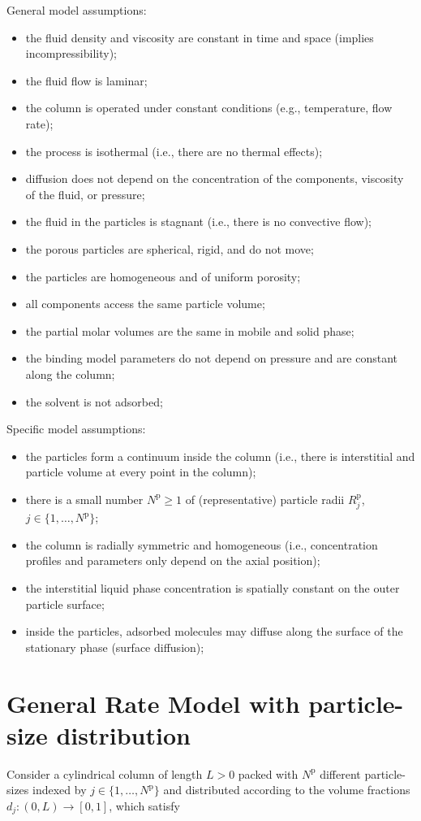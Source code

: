 \documentclass{article}
\begin{document}
General model assumptions:
\begin{itemize}
\item the fluid density and viscosity are constant in time and space (implies incompressibility);
\item the fluid flow is laminar;
\item the column is operated under constant conditions (e.g., temperature, flow rate);
\item the process is isothermal (i.e., there are no thermal effects);
\item diffusion does not depend on the concentration of the components, viscosity of the fluid, or pressure;
\item the fluid in the particles is stagnant (i.e., there is no convective flow);
\item the porous particles are spherical, rigid, and do not move;
\item the particles are homogeneous and of uniform porosity;
\item all components access the same particle volume;
\item the partial molar volumes are the same in mobile and solid phase;
\item the binding model parameters do not depend on pressure and are constant along the column;
\item the solvent is not adsorbed;
\end{itemize}


Specific model assumptions:
\begin{itemize}
\item the particles form a continuum inside the column (i.e., there is interstitial and particle volume at every point in the column);
\item there is a small number $N^{\mathrm{p}}\geq 1$ of (representative) particle radii $R^{\mathrm{p}}_{j}$, $j \in \{ 1, \dots, N^{\mathrm{p}} \}$;
\item the column is radially symmetric and homogeneous (i.e., concentration profiles and parameters only depend on the axial position);
\item the interstitial liquid phase concentration is spatially constant on the outer particle surface;
\item inside the particles, adsorbed molecules may diffuse along the surface of the stationary phase (surface diffusion);
\end{itemize}


\section*{General Rate Model with particle-size distribution}
Consider a cylindrical column of length $L > 0$ packed with $N^{\mathrm{p}}$ different particle-sizes indexed by $j \in \{1, \dots, N^{\mathrm{p}}\}$ and distributed according to the volume fractions $d_j \colon (0, L) \to [0, 1]$, which satisfy
\end{document}
